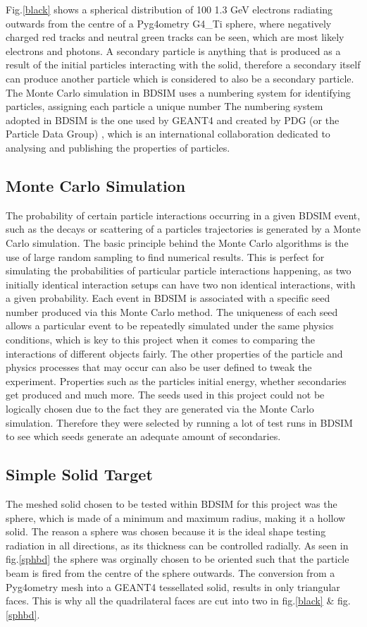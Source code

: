 \documentclass[12pt,a4paper]{article}
\begin{document}
\noindent Fig.\ref{black} shows a spherical distribution of 100 1.3 GeV electrons radiating outwards from the centre of a Pyg4ometry G4\_Ti sphere, where negatively charged red tracks and neutral green tracks can be seen, which are most likely electrons and photons. A secondary particle is anything that is produced as a result of the initial particles interacting with the solid, therefore a secondary itself can produce another particle which is considered to also be  a secondary particle. The Monte Carlo simulation in BDSIM uses a numbering system for identifying particles, assigning each particle a unique number The numbering system adopted in BDSIM is the one used by GEANT4 and created by PDG (or the Particle Data Group) \cite{pdg}, which is an international collaboration dedicated to analysing and publishing the properties of particles. 

\subsection{Monte Carlo Simulation}
\label{monte}
\noindent The probability of certain particle interactions occurring in a given BDSIM event, such as the decays or scattering of a particles trajectories is generated by a Monte Carlo simulation. The basic principle behind the Monte Carlo algorithms is the use of large random sampling to find numerical results. This is perfect for simulating the probabilities of particular particle interactions happening, as two initially identical interaction setups can have two non identical interactions, with a given probability. Each event in BDSIM is associated with a specific seed number produced via this Monte Carlo method. The uniqueness of each seed allows a particular event to be repeatedly simulated under the same physics conditions, which is key to this project when it comes to comparing the interactions of different objects fairly. The other properties of the particle and physics processes that may occur can also be user defined to tweak the experiment. Properties such as the particles initial energy, whether secondaries get produced and much more. The seeds used in this project could not be logically chosen due to the fact they are generated via the Monte Carlo simulation. Therefore they were selected by running a lot of test runs in BDSIM to see which seeds generate an adequate amount of secondaries.

\subsection{Simple Solid Target}
The meshed solid chosen to be tested within BDSIM for this project was the sphere, which is made of a minimum and maximum radius, making it a hollow solid. The reason a sphere was chosen because it is the ideal shape testing radiation in all directions, as its thickness can be controlled radially. As seen in fig.\ref{sphbd} the sphere was orginally chosen to be oriented such that the particle beam is fired from the centre of the sphere outwards. The conversion from a Pyg4ometry mesh into a GEANT4 tessellated solid, results in only triangular faces. This is why all the quadrilateral faces are cut into two in fig.\ref{black} \& fig. \ref{sphbd}.
\end{document}
